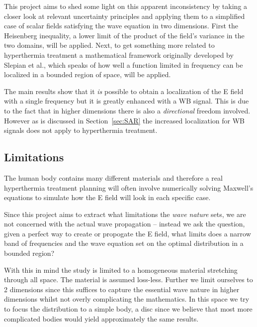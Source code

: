 \documentclass[11pt,a4paper, 
swedish,english %
]{article}
\begin{document}
This project aims to shed some light on this apparent inconsistency by taking a closer look at relevant uncertainty principles and applying them to a simplified case of scalar fields satisfying the wave equation in two dimensions.
First the Heisenberg inequality, a lower limit of the product of the field's variance in the two domains, will be applied.
Next, to get something more related to hyperthermia treatment a mathematical framework originally developed by Slepian et al., which speaks of how well a function limited in frequency can be localized in a bounded region of space, will be applied.

The main results show that it \emph{is} possible to obtain a localization of the E field with a single frequency but it is greatly enhanced with a WB signal. This is due to the fact that in higher dimensions there is also a \emph{directional} freedom involved. However as is discussed in Section~\ref{sec:SAR} the increased localization for WB signals does not apply to hyperthermia treatment. 



\subsection{Limitations}
The human body contains many different materials and therefore a real hyperthermia treatment planning will often involve numerically solving Maxwell's equations to simulate how the E field will look in each specific case.

Since this project aims to extract what limitations the \emph{wave nature} sets, we are not concerned with the actual wave propagation -- instead we ask the question, given a perfect way to create or propogate the E field, what limits does a narrow band of frequencies and the wave equation set on the optimal distribution in a bounded region?

With this in mind the study is limited to a homogeneous material stretching through all space. The material is assumed loss-less. %
Further we limit ourselves to 2 dimensions since this suffices to capture the essential wave nature in higher dimensions whilst not overly complicating the mathematics. 
In this space we try to focus the distribution to a simple body, a disc since we believe that most more complicated bodies would yield approximately the same results.
\end{document}
